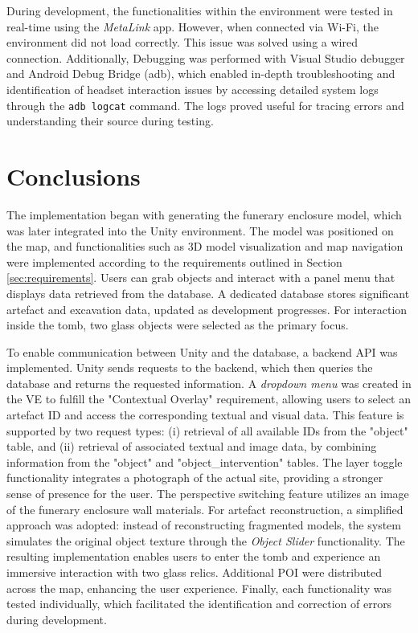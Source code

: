 During development, the functionalities within the environment were tested in real-time using the \emph{MetaLink} app. However, when connected via Wi-Fi, the environment did not load correctly. This issue was solved using a wired connection.
Additionally, Debugging was performed with Visual Studio debugger and Android Debug Bridge (adb), which enabled in-depth troubleshooting and identification of headset interaction issues by accessing detailed system logs through the \texttt{adb logcat} command. The logs proved useful for tracing errors and understanding their source during testing.

\section{Conclusions}
\label{sec:impl_discussion}
The implementation began with generating the funerary enclosure model, which was later integrated into the Unity environment. The model was positioned on the map, and functionalities such as \gls{3D} model visualization and map navigation were implemented according to the requirements outlined in Section \ref{sec:requirements}. Users can grab objects and interact with a panel menu that displays data retrieved from the database. A dedicated database stores significant artefact and excavation data, updated as development progresses. 
For interaction inside the tomb, two glass objects were selected as the primary focus.

To enable communication between Unity and the database, a backend \gls{API} was implemented. Unity sends requests to the backend, which then queries the database and returns the requested information. 
A \emph{dropdown menu} was created in the \gls{VE} to fulfill the "Contextual Overlay" requirement, allowing users to select an artefact \gls{ID} and access the corresponding textual and visual data. 
This feature is supported by two request types: (i) retrieval of all available \glspl{ID} from the "object" table, and (ii) retrieval of associated textual and image data, by combining information from the "object" and "object\_intervention" tables.
The layer toggle functionality integrates a photograph of the actual site, providing a stronger sense of presence for the user. The perspective switching feature utilizes an image of the funerary enclosure wall materials.
For artefact reconstruction, a simplified approach was adopted: instead of reconstructing fragmented models, the system simulates the original object texture through the \emph{Object Slider} functionality.
The resulting implementation enables users to enter the tomb and experience an immersive interaction with two glass relics. Additional \gls{POI} were distributed across the map, enhancing the user experience.
Finally, each functionality was tested individually, which facilitated the identification and correction of errors during development.
